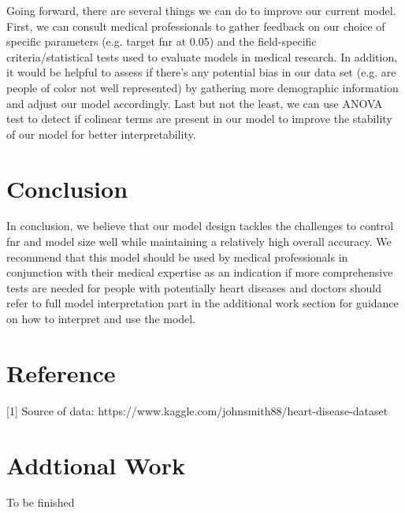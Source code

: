 \documentclass{article}
\begin{document}
Going forward, there are several things we can do to improve our current model.
First, we can consult medical professionals to gather feedback on our choice
of specific parameters (e.g. target fnr at 0.05) and the field-specific
criteria/statistical tests used to evaluate models in medical research.
In addition, it would be helpful to assess if there's any potential bias
in our data set (e.g. are people of color not well represented)
by gathering more demographic information and adjust our model accordingly.
Last but not the least, we can use ANOVA test to detect if colinear terms are
present in our model to improve the stability of our model for better interpretability.\\

\section{Conclusion}
In conclusion, we believe that our model design tackles the challenges to control
fnr and model size well while maintaining a relatively high overall accuracy.
We recommend that this model should be used by medical professionals
in conjunction with their medical expertise as an indication
if more comprehensive tests are needed for people with potentially heart diseases
and doctors should refer to full model interpretation part in the additional work
section for guidance on how to interpret and use the model.\\



\section{Reference}
[1] Source of data: https://www.kaggle.com/johnsmith88/heart-disease-dataset \\



\section{Addtional Work}
To be finished\\
\end{document}
